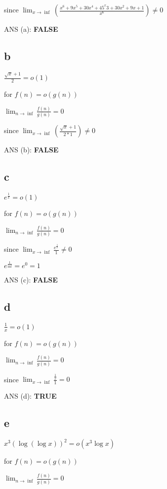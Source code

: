 \documentclass[
]{article}
\begin{document}
since
\(\lim_{x \to \inf} (\frac{x^6+9x^5+30x^4+45^x3+30x^2+9x+1}{x^6}) \ne 0\)

ANS (a): \textbf{FALSE}

\hypertarget{b-1}{%
\subsection{b}\label{b-1}}

\(\frac{\sqrt{x}+1}{2} = o(1)\)

for \(f(n) = o(g(n))\)

\(\lim_{n \to \inf} \frac{f(n)}{g(n)}= 0\)

since \(\lim_{x \to \inf} (\frac{\sqrt{x}+1}{2 * 1}) \ne 0\)

ANS (b): \textbf{FALSE}

\hypertarget{c}{%
\subsection{c}\label{c}}

\(e^\frac{1}{x} = o(1)\)

for \(f(n) = o(g(n))\)

\(\lim_{n \to \inf} \frac{f(n)}{g(n)} = 0\)

since \(\lim_{x \to \inf} \frac {e^\frac{1}{x}}{1} \ne 0\)

\(e^\frac{1}{\inf} = e^0 = 1\)

ANS (c): \textbf{FALSE}

\hypertarget{d}{%
\subsection{d}\label{d}}

\(\frac{1}{x} = o(1)\)

for \(f(n) = o(g(n))\)

\(\lim_{n \to \inf} \frac{f(n)}{g(n)} = 0\)

since \(\lim_{x \to \inf} \frac {\frac{1}{x}}{1} = 0\)

ANS (d): \textbf{TRUE}

\hypertarget{e}{%
\subsection{e}\label{e}}

\(x^3(\log(\log{x}))^2 = o(x^3 \log{x})\)

for \(f(n) = o(g(n))\)

\(\lim_{n \to \inf} \frac{f(n)}{g(n)} = 0\)
\end{document}
